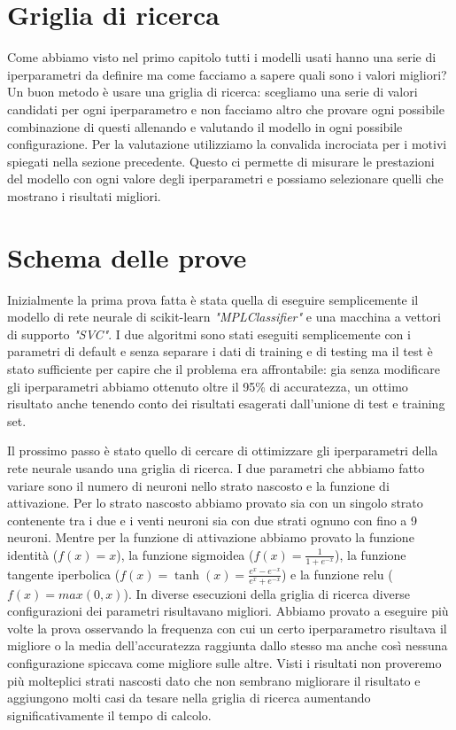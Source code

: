\documentclass[a4paper,12pt]{report}
\begin{document}

\section{Griglia di ricerca}
Come abbiamo visto nel primo capitolo tutti i modelli usati hanno una serie di
iperparametri da definire ma come facciamo a sapere quali sono i valori
migliori? Un buon metodo è usare una griglia di ricerca: scegliamo una serie di
valori candidati per ogni iperparametro e non facciamo altro che provare ogni
possibile combinazione di questi allenando e valutando il modello in ogni
possibile configurazione. Per la valutazione utilizziamo la convalida incrociata
per i motivi spiegati nella sezione precedente. Questo ci permette di misurare
le prestazioni del modello con ogni valore degli iperparametri e possiamo
selezionare quelli che mostrano i risultati migliori.

\section{Schema delle prove}
Inizialmente la prima prova fatta è stata quella di eseguire semplicemente il
modello di rete neurale di scikit-learn {\it "MPLClassifier"} e una macchina a
vettori di supporto {\it "SVC"}. I due algoritmi sono stati eseguiti
semplicemente con i parametri di default e senza separare i dati di training e
di testing ma il test è stato sufficiente per capire che il problema era
affrontabile: gia senza modificare gli iperparametri abbiamo ottenuto oltre il
95\% di accuratezza, un ottimo risultato anche tenendo conto dei risultati
esagerati dall'unione di test e training set.

Il prossimo passo è stato quello di cercare di ottimizzare gli iperparametri
della rete neurale usando una griglia di ricerca. I due parametri che abbiamo
fatto variare sono il numero di neuroni nello strato nascosto e la funzione di
attivazione. Per lo strato nascosto abbiamo provato sia con un singolo strato
contenente tra i due e i venti neuroni sia con due strati ognuno con fino a 9
neuroni. Mentre per la funzione di attivazione abbiamo provato la funzione
identità ($f(x) = x$), la funzione sigmoidea ($f(x) = \frac{1}{1 + e^{-x}}$), la
funzione tangente iperbolica ($f(x)=\tanh(x) = \frac {e^x - e^{-x}} {e^x +
e^{-x}}$) e la funzione relu ($f(x) = max(0, x)$). In diverse esecuzioni della
griglia di ricerca diverse configurazioni dei parametri risultavano migliori.
Abbiamo provato a eseguire più volte la prova osservando la frequenza con cui un
certo iperparametro risultava il migliore o la media dell'accuratezza raggiunta
dallo stesso ma anche così nessuna configurazione spiccava come migliore sulle
altre. Visti i risultati non proveremo più molteplici strati nascosti dato che
non sembrano migliorare il risultato e aggiungono molti casi da tesare nella
griglia di ricerca aumentando significativamente il tempo di calcolo.
\end{document}
